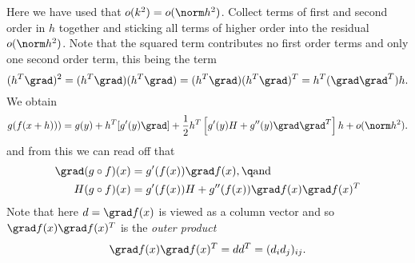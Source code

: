 %
Here we have used that $o(k^2)=o(\norm h^2)$.
Collect terms of first and second order in $h$ together and sticking
all terms of higher order into the residual $o(\norm h^2)$. Note that
the squared term contributes no first order terms and only one second order term,
this being the term
$$
(h^T\grad)^2=
(h^T\grad)(h^T\grad)=
(h^T\grad)(h^T\grad)^T=
h^T(\grad\grad^T)h.
$$
We obtain
$$
g(f(x+h)))=g(y)+h^T[g'(y)\grad]+
\frac{1}{2}h^T\left[
g'(y)H+g''(y)\grad\grad^T
\right]h+o(\norm h^2).
$$
and from this we can read off that
%
\begin{align}
\label{taylor_of_composition}
\grad(g\circ f)(x)&=g'(f(x))\grad f(x),\q\text{and}\\
H(g\circ f)(x)&=g'(f(x))H+g''(f(x))\grad f(x)\grad f(x)^T
\end{align}
%
Note that here $d=\grad f(x)$ is viewed as a column vector and so $\grad f(x)\grad f(x)^T$
is the \textit{outer product}
$$
\grad f(x)\grad f(x)^T=dd^T=(d_id_j)_{ij}.
$$
 
    